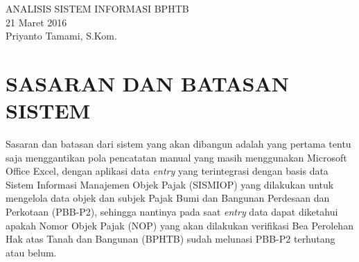 \documentclass[pdftex,12pt, oneside]{article}
\begin{document}
\sloppy

%
\begin{center}
{\large ANALISIS SISTEM INFORMASI BPHTB}
\\[1cm]
21 Maret 2016\\
Priyanto Tamami, S.Kom.
\end{center}


%
%

% 


%
%
%
%

%
%
%
% 
% 
% 

%
%


\section{SASARAN DAN BATASAN SISTEM}

Sasaran dan batasan dari sistem yang akan dibangun adalah yang pertama tentu saja menggantikan pola pencatatan manual yang masih menggunakan Microsoft Office Excel, dengan aplikasi data \textit{entry} yang terintegrasi dengan basis data Sistem Informasi Manajemen Objek Pajak (SISMIOP) yang dilakukan untuk mengelola data objek dan subjek Pajak Bumi dan Bangunan Perdesaan dan Perkotaan (PBB-P2), sehingga nantinya pada saat \textit{entry} data dapat diketahui apakah Nomor Objek Pajak (NOP) yang akan dilakukan verifikasi Bea Perolehan Hak atas Tanah dan Bangunan (BPHTB) sudah melunasi PBB-P2 terhutang atau belum.
\end{document}
